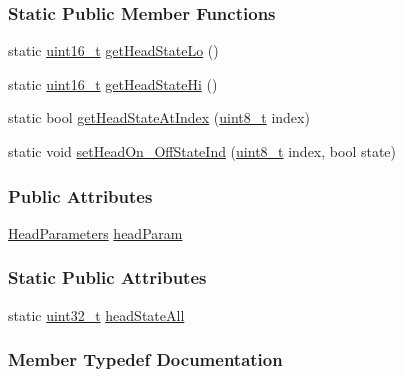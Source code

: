 \subsubsection*{Static Public Member Functions}
\begin{DoxyCompactItemize}
\item 
static \mbox{\hyperlink{settings_8h_a017dd44e68049ffdd31500a8cd01ba68}{uint16\+\_\+t}} \mbox{\hyperlink{classHeadSetting_aefe83a9a9da6123bbe8ccd2df9258e3d}{get\+Head\+State\+Lo}} ()
\item 
static \mbox{\hyperlink{settings_8h_a017dd44e68049ffdd31500a8cd01ba68}{uint16\+\_\+t}} \mbox{\hyperlink{classHeadSetting_aa63ae6dc7f85ebb31c3245a69634857e}{get\+Head\+State\+Hi}} ()
\item 
static bool \mbox{\hyperlink{classHeadSetting_a356608c5e1fa48fdb3757b756a87de77}{get\+Head\+State\+At\+Index}} (\mbox{\hyperlink{settings_8h_a48091a1e52849b0871df2f7081be2e38}{uint8\+\_\+t}} index)
\item 
static void \mbox{\hyperlink{classHeadSetting_a3559c23ea969b8dd8e42312b95362194}{set\+Head\+On\+\_\+\+Off\+State\+Ind}} (\mbox{\hyperlink{settings_8h_a48091a1e52849b0871df2f7081be2e38}{uint8\+\_\+t}} index, bool state)
\end{DoxyCompactItemize}
\subsubsection*{Public Attributes}
\begin{DoxyCompactItemize}
\item 
\mbox{\hyperlink{classHeadSetting_ab604bc48df56fc11dd649357ae7b45b8}{Head\+Parameters}} \mbox{\hyperlink{classHeadSetting_a842397f02022fd1d4217afb65beac990}{head\+Param}}
\end{DoxyCompactItemize}
\subsubsection*{Static Public Attributes}
\begin{DoxyCompactItemize}
\item 
static \mbox{\hyperlink{settings_8h_a4196118492a3b1493c81f250e90af775}{uint32\+\_\+t}} \mbox{\hyperlink{classHeadSetting_ab80c33d0484f96c53e92ce1842fd0b43}{head\+State\+All}}
\end{DoxyCompactItemize}


\subsubsection{Member Typedef Documentation}
\mbox{\label{classHeadSetting_a53d6fb7e789941346f1fb2094317a78e}} 
